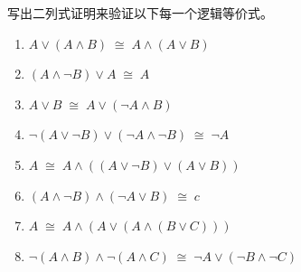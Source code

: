 
写出二列式证明来验证以下每一个逻辑等价式。

\begin{enumerate}
\item $A \lor (A \land B) \; \cong \; A \land (A \lor B)$
\medskip

\item $(A \land {\lnot}B) \lor A \; \cong \; A$
\medskip

\item $A \lor B \; \cong \; A \lor ({\lnot}A \land B)$
\medskip

\item ${\lnot}(A \lor {\lnot}B) \lor ({\lnot}A \land {\lnot}B) \; \cong \; {\lnot}A$
\medskip

\item $A \; \cong \; A \land ((A \lor {\lnot}B) \lor (A \lor B))$
\medskip

\item $(A \land {\lnot}B) \land ({\lnot}A \lor B) \; \cong \; c$
\medskip

\item $A \; \cong \; A \land (A \lor (A \land (B \lor C)))$
\medskip

\item ${\lnot}(A \land B) \land {\lnot}(A \land C) \; \cong \; {\lnot}A \lor ({\lnot}B \land {\lnot}C)$
\medskip

\end{enumerate}

\workbookpagebreak

\rule{0pt}{0pt}

\workbookpagebreak